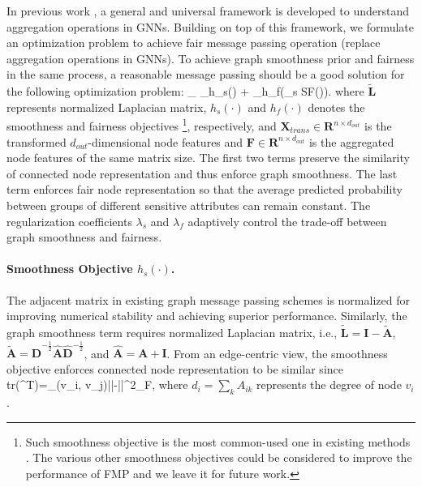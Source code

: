 \documentclass[letterpaper]{article} %
\theoremstyle{plain}
\theoremstyle{definition}
\theoremstyle{remark}
\begin{document}
In previous work \citep{ma2021unified}, a general and universal framework is developed to understand aggregation operations in GNNs. Building on top of this framework, we formulate an optimization problem to achieve fair message passing operation (replace aggregation operations in GNNs).
To achieve graph smoothness prior and fairness in the same process, a reasonable message passing should be a good solution for the following optimization problem:
\be \label{eq:optimization}
\min\limits_{} _{h_s()} + _{h_f\big(\mathbf{\Delta}_s SF()\big)}.
\ee  
where $\tilde{\mathbf{L}}$ represents normalized Laplacian matrix, $h_s(\cdot)$ and $h_f(\cdot)$ denotes the smoothness and fairness objectives \footnote{Such smoothness objective is the most common-used one in existing methods \citep{ma2021unified,belkin2001laplacian,kalofolias2016learn}.
The various other smoothness objectives could be considered to improve the performance of FMP and we leave it for future work.}, respectively, and
$\mathbf{X}_{trans}\in \mathbf{R}^{n \times d_{out}}$ is the transformed $d_{out}$-dimensional node features and $\mathbf{F}\in \mathbf{R}^{n \times d_{out}}$ is the aggregated node features of the same matrix size. The first two terms preserve the similarity of connected node representation and thus enforce graph smoothness. The last term enforces fair node representation so that the average predicted probability between groups of different sensitive attributes can remain constant. The regularization coefficients $\lambda_s$ and $\lambda_f$ adaptively control the trade-off between graph smoothness and fairness. 

\paragraph{Smoothness Objective $h_s(\cdot)$.} The adjacent matrix in existing graph message passing schemes is normalized for improving numerical stability and achieving superior performance. Similarly, the graph smoothness term requires normalized Laplacian matrix, i.e., $\tilde{\mathbf{L}}=\mathbf{I}-\tilde{\mathbf{A}}$, $\tilde{\mathbf{A}}=\hat{\mathbf{D}}^{-\frac{1}{2}}\hat{\mathbf{A}}\hat{\mathbf{D}}^{-\frac{1}{2}}$, and $\hat{\mathbf{A}}=\mathbf{A}+\mathbf{I}$. From an edge-centric view, the smoothness objective enforces connected node representation to be similar since 
\be 
tr(^{T})=\sum_{(v_i, v_j)\in{}}||-||^2_F,
\ee 
where $d_i=\sum_{k}A_{ik}$ represents the degree of node $v_i$.
\end{document}
